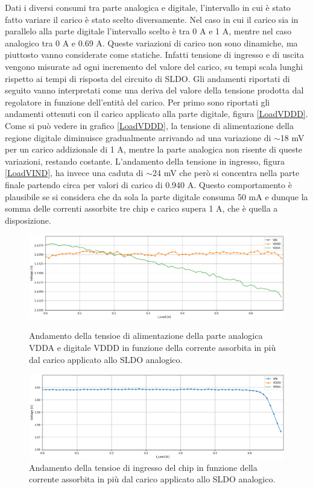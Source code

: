 Dati i diversi consumi tra parte analogica e digitale, l'intervallo in cui è stato fatto variare il carico è stato scelto diversamente. Nel caso in cui il carico sia in parallelo alla parte digitale l'intervallo scelto è tra 0 A e 1 A, mentre nel caso analogico tra 0 A e 0.69 A. 
Queste variazioni di carico non sono dinamiche, ma piuttosto vanno considerate come statiche. Infatti tensione di ingresso e di uscita vengono misurate ad ogni incremento del valore del carico, su tempi scala lunghi rispetto ai tempi di risposta del circuito di SLDO. 
Gli andamenti riportati di seguito vanno interpretati come una deriva del valore della tensione prodotta dal regolatore in funzione dell'entità del carico. 
Per primo sono riportati gli andamenti ottenuti con il carico applicato alla parte digitale, figura \ref{LoadVDDD}. 
Come si può vedere in grafico \ref{LoadVDDD}, la tensione di alimentazione della regione digitale diminuisce gradualmente arrivando ad una variazione di $\sim$18 mV per un carico addizionale di 1 A, mentre la parte analogica non risente di queste variazioni, restando costante. %
L'andamento della tensione in ingresso, figura \ref{LoadVIND}, ha invece una caduta di $\sim$24 mV che però si concentra nella parte finale partendo circa per valori di carico di 0.940 A.
Questo comportamento è plausibile se si considera che da sola la parte digitale consuma 50 mA e dunque la somma delle correnti assorbite tre chip e carico supera 1 A, che è quella a disposizione. 
\begin{figure}
\centering
\includegraphics[width=\textwidth]{Immagini/LoadVDDA}
\caption{Andamento della tensioe di alimentazione della parte analogica VDDA e digitale VDDD in funzione della corrente assorbita in più dal carico applicato allo SLDO analogico.}
\label{LoadVDDA}
\includegraphics[width=\textwidth]{Immagini/LoadVINA}
\caption{Andamento della tensioe di ingresso del chip in funzione della corrente assorbita in più dal carico applicato allo SLDO analogico.}
\label{LoadVINA}
\end{figure}
